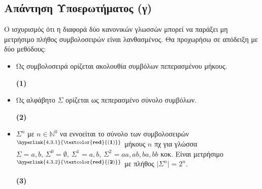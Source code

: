 \subsection{Απάντηση Υποερωτήματος (γ)}
\label{ssec:Solution_4.2}
\doublespacing

Ο ισχυρισμός ότι η διαφορά δύο κανονικών γλωσσών μπορεί να παράξει μη μετρήσιμο πλήθος συμβολοσειρών είναι
λανθασμένος. Θα προχωρήσω σε απόδειξη με δύο μεθόδους:

\begin{tcolorbox}[colback=yellow!15!white, colframe=blue!50!white,
	fonttitle=\bfseries\Large, title = Απόδειξη - μέρος 1/2]
\begin{itemize}
	\itemsep1em

	\item Ως συμβολοσειρά ορίζεται ακολουθία συμβόλων πεπερασμένου μήκους.
	\reducevspace\reducevspace\reducevspace\reducevspace\reducevspace\reducevspace\reducevspace
	\reducevspace\reducevspace\reducevspace\reducevspace\reducevspace\reducevspace\reducevspace
	\begin{flushright}\hypertarget{4.3.1}{\bf{(1)}}\end{flushright}

	\item Ως αλφάβητο $\Sigma$ ορίζεται ως πεπερασμένο σύνολο συμβόλων.
	\reducevspace\reducevspace\reducevspace\reducevspace\reducevspace\reducevspace\reducevspace
	\reducevspace\reducevspace\reducevspace\reducevspace\reducevspace\reducevspace\reducevspace
	\begin{flushright}\hypertarget{4.3.2}{\bf{(2)}}\end{flushright}

	\item $\Sigma^n$ με $n \in \mathbb{N}^0$ να εννοείται το σύνολο των
	συμβολοσειρών$^{\hyperlink{4.3.1}{\bf{\textcolor{red}{(1)}}}}$ μήκους $n$ πχ για γλώσσα
	$\Sigma = {a, b},\, \Sigma^0 = {\emptyset},\, \Sigma^1 = {a, b},\, \Sigma^2 = {aa, ab, ba, bb}$ κοκ.
	Eίναι μετρήσιμο$^{\hyperlink{4.3.2}{\bf{\textcolor{red}{(2)}}}}$ με πλήθος $\vert\Sigma^n\vert = 2^n$.
	\reducevspace\reducevspace\reducevspace\reducevspace\reducevspace\reducevspace\reducevspace
	\reducevspace\reducevspace\reducevspace\reducevspace\reducevspace\reducevspace\reducevspace
	\begin{flushright}\hypertarget{4.3.3}{\bf{(3)}}\end{flushright}


\end{itemize}
\end{tcolorbox}
